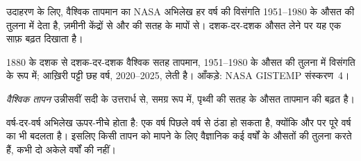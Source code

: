 उदाहरण के लिए, वैश्विक तापमान का NASA अभिलेख हर वर्ष की विसंगति 1951--1980 के औसत की
तुलना में देता है, ज़मीनी केंद्रों से और  की सतह के मापों से। दशक-दर-दशक औसत
लेने पर यह एक साफ़ बढ़त दिखाता
है।

\begin{omfigure}

{\small 1880 के दशक से दशक-दर-दशक वैश्विक सतह तापमान, 1951--1980 के औसत की तुलना
में विसंगति के रूप में; आख़िरी पट्टी छह वर्ष, 2020--2025, लेती है। आँकड़े: NASA
GISTEMP संस्करण~4।}
\label{fig:g9:climate-past-and-present:decades}
\end{omfigure}

\begin{definition}[वैश्विक तापन]\label{def:g9:climate-past-and-present:global-warming}
\emph{वैश्विक तापन} उन्नीसवीं सदी के उत्तरार्ध से, समग्र रूप में,
पृथ्वी की सतह के औसत तापमान की बढ़त
है।
\end{definition}

वर्ष-दर-वर्ष अभिलेख ऊपर-नीचे होता है: एक वर्ष पिछले वर्ष से ठंडा हो सकता है, क्योंकि
 और  पर पूरे वर्ष का  भी बदलता है। इसलिए किसी तापन को मापने के
लिए वैज्ञानिक कई वर्षों के औसतों की तुलना करते हैं, कभी दो अकेले वर्षों की
नहीं।

